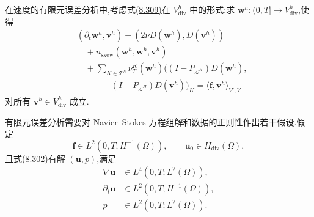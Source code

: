 \begin{note}[离散问题的表述]
在速度的有限元误差分析中,考虑式\hyperref[eq:vms-coarse-projection-discrete-method]{(8.309)}在 $V_{\mathrm{div}}^h$ 中的形式:求 $\bm w^h:(0,T]\to V_{\mathrm{div}}^h$,使得
\begin{equation}\label{eq:vms-coarse-projection-divergence-free-method}
\begin{aligned}
 &(\partial_t\bm w^h,\bm v^h)
 +(2\nu D(\bm w^h),D(\bm v^h))\\
 &\quad+n_{\mathrm{skew}}(\bm w^h,\bm w^h,\bm v^h)\\
 &\quad+\sum_{K\in\mathcal T^h}
  \nu_T^K(\bm w^h)
  ((I-P_{\mathcal L^H})D(\bm w^h),\\
 &\qquad\qquad (I-P_{\mathcal L^H})D(\bm v^h))_K
 =\langle\bm f,\bm v^h\rangle_{V',V}
\end{aligned}
\end{equation}
对所有 $\bm v^h\in V_{\mathrm{div}}^h$ 成立.
\end{note}

\begin{note}
\label{note:vms-coarse-projection-data-assumptions}
有限元误差分析需要对 Navier--Stokes 方程组解和数据的正则性作出若干假设.假定
\begin{equation}\label{eq:vms-coarse-projection-data-assumptions}
 \bm f\in L^2(0,T;H^{-1}(\Omega)),\qquad
 \bm u_0\in H_{\mathrm{div}}(\Omega),
\end{equation}
且式\hyperref[eq:vms-coarse-projection-continuous-equation]{(8.302)}有解 $(\bm u,p)$,满足
\begin{equation}\label{eq:vms-coarse-projection-solution-regularity}
 \begin{aligned}
 \nabla\bm u&\in L^4(0,T;L^2(\Omega)),\\
 \partial_t\bm u&\in L^2(0,T;H^{-1}(\Omega)),\\
 p&\in L^2(0,T;L^2(\Omega)).
 \end{aligned}
\end{equation}
\end{note}

